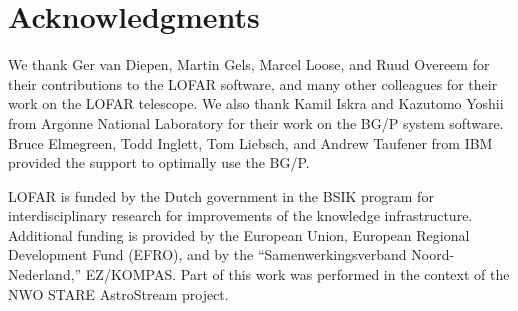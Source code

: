 \documentclass{sig-alternate}
\begin{document}
%
%
%


\section*{Acknowledgments}
\begin{small}
We thank Ger van Diepen, Martin Gels, Marcel Loose, and Ruud Overeem
for their contributions to the LOFAR software, and many other colleagues
for their work on the LOFAR telescope.
We also thank Kamil Iskra and Kazutomo Yoshii from Argonne National Laboratory
for their work on the BG/P system software.
Bruce Elmegreen, Todd Inglett, Tom Liebsch, and Andrew Taufener from IBM
provided the support to optimally use the BG/P.

LOFAR is funded by the Dutch government in the BSIK program for
interdisciplinary research for improvements of the knowledge
infrastructure.  Additional funding is provided by the European Union,
European Regional Development Fund (EFRO), and by the
``Samenwerkingsverband Noord-Nederland,'' EZ/KOMPAS. Part of this work was
performed in the context of the NWO STARE AstroStream project.
\end{small}



\end{document}
